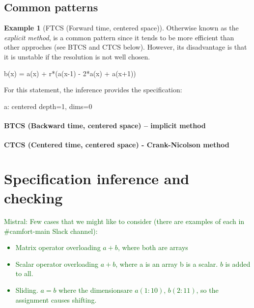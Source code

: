 \documentclass[10pt]{sigplanconf}
\newcommand{\mnote}[1]{\textcolor{darkgreen}{Mistral: #1}}
\newcounter{block}
\theoremstyle{definition}
\newtheorem{example}[block]{Example}
\begin{document}
\subsection{Common patterns}

\begin{example}[FTCS (Forward time, centered space)]

  Otherwise known as the \emph{explicit method}, is a common
  pattern since it tends to be more efficient than other approches
  (see BTCS and CTCS below). However, its disadvantage is that it is
  unstable if the resolution is not well chosen. 

\begin{ExmVerbatim}
b(x) = a(x) + r*(a(x-1) - 2*a(x) + a(x+1))
\end{ExmVerbatim}
%
For this statement, the inference provides the specification: 
%
\begin{SpecVerbatim}
a: centered depth=1, dims=0
\end{SpecVerbatim}



\end{example}

\paragraph{BTCS (Backward time, centered space) -- implicit method}

\paragraph{CTCS (Centered time, centered space) - Crank-Nicolson method}



\section{Specification inference and checking}
\label{sec:analysis}

\mnote{Few cases that we might like to consider (there are examples
    of each in \#camfort-main Slack channel): 
  \begin{itemize}
    \item Matrix operator overloading $a + b$, where both are arrays
    \item Scalar operator overloading $a + b$, where a is an array b is a 
      scalar. $b$ is added to all.
    \item Sliding. $a = b$ where the dimensionsare $a(1:10)$, $b(2:11)$,
      so the assignment causes shifting.
  \end{itemize}
}
\end{document}
